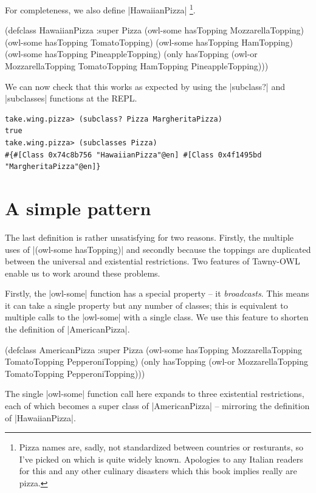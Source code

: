 For completeness, we also define |HawaiianPizza| \footnote{Pizza names are, sadly,
not standardized between countries or resturants, so I've picked on which is
quite widely known. Apologies to any Italian readers for this and any other
culinary disasters which this book implies really are pizza.}.

\begin{tawny}
(defclass HawaiianPizza
  :super
  Pizza
  (owl-some hasTopping MozzarellaTopping)
  (owl-some hasTopping TomatoTopping)
  (owl-some hasTopping HamTopping)
  (owl-some hasTopping PineappleTopping)
  (only hasTopping
        (owl-or MozzarellaTopping TomatoTopping HamTopping PineappleTopping)))
\end{tawny}

We can now check that this works as expected by using the |subclass?| and
|subclasses| functions at the REPL.

\begin{verbatim}
take.wing.pizza> (subclass? Pizza MargheritaPizza)
true
take.wing.pizza> (subclasses Pizza)
#{#[Class 0x74c8b756 "HawaiianPizza"@en] #[Class 0x4f1495bd "MargheritaPizza"@en]}
\end{verbatim}

\section{A simple pattern}
\label{sec:simple-pattern}

The last definition is rather unsatisfying for two reasons. Firstly, the
multiple uses of |(owl-some hasTopping)| and secondly because the toppings are
duplicated between the universal and existential restrictions. Two features of
Tawny-OWL enable us to work around these problems.

Firstly, the |owl-some| function has a special property -- it
\emph{broadcasts}. This means it can take a single property but any
number of classes; this is equivalent to multiple calls to the
|owl-some| with a single class. We use this feature to shorten the
definition of |AmericanPizza|.

\begin{tawny}
(defclass AmericanPizza
  :super
  Pizza
  (owl-some hasTopping MozzarellaTopping
            TomatoTopping PepperoniTopping)
  (only hasTopping (owl-or MozzarellaTopping TomatoTopping PepperoniTopping)))
\end{tawny}

The single |owl-some| function call here expands to three existential
restrictions, each of which becomes a super class of |AmericanPizza| --
mirroring the definition of |HawaiianPizza|.

